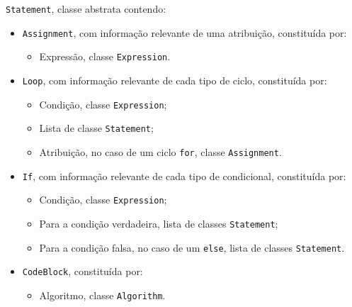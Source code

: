 \documentclass[12pt,a4paper]{report}
\begin{document}
\texttt{Statement}, classe abstrata contendo:
\begin{itemize}
    \item \texttt{Assignment}, com informação relevante de uma atribuição, constituída por:
    \begin{itemize}
        \item Expressão, classe \texttt{Expression}.
    \end{itemize}
    \item \texttt{Loop}, com informação relevante de cada tipo de ciclo, constituída por:
    \begin{itemize}
        \item Condição, classe \texttt{Expression};
        \item Lista de classe \texttt{Statement};
        \item Atribuição, no caso de um ciclo \texttt{for}, classe \texttt{Assignment}.
    \end{itemize}
    \item \texttt{If}, com informação relevante de cada tipo de condicional, constituída por:
    \begin{itemize}
        \item Condição, classe \texttt{Expression};
        \item Para a condição verdadeira, lista de classes \texttt{Statement};
        \item Para a condição falsa, no caso de um \texttt{else}, lista de classes \texttt{Statement}.
    \end{itemize}
    \item \texttt{CodeBlock}, constituída por:
    \begin{itemize}
        \item Algoritmo, classe \texttt{Algorithm}.
    \end{itemize}
\end{itemize}

\vspace{5mm}
\end{document}
